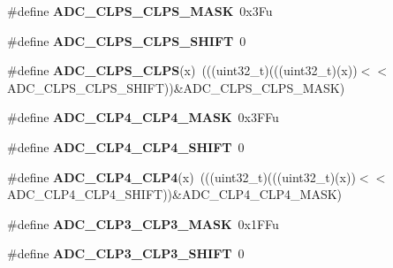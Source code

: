 \begin{DoxyCompactItemize}
\item 
\#define {\bfseries A\+D\+C\+\_\+\+C\+L\+P\+S\+\_\+\+C\+L\+P\+S\+\_\+\+M\+A\+SK}~0x3\+Fu\hypertarget{group__ADC__Register__Masks_gaccedf61066feb0b1c6d6bd7794d2a79c}{}\label{group__ADC__Register__Masks_gaccedf61066feb0b1c6d6bd7794d2a79c}

\item 
\#define {\bfseries A\+D\+C\+\_\+\+C\+L\+P\+S\+\_\+\+C\+L\+P\+S\+\_\+\+S\+H\+I\+FT}~0\hypertarget{group__ADC__Register__Masks_ga94f5e6c337622e8c4b8d03201e1c2d11}{}\label{group__ADC__Register__Masks_ga94f5e6c337622e8c4b8d03201e1c2d11}

\item 
\#define {\bfseries A\+D\+C\+\_\+\+C\+L\+P\+S\+\_\+\+C\+L\+PS}(x)~(((uint32\+\_\+t)(((uint32\+\_\+t)(x))$<$$<$A\+D\+C\+\_\+\+C\+L\+P\+S\+\_\+\+C\+L\+P\+S\+\_\+\+S\+H\+I\+FT))\&A\+D\+C\+\_\+\+C\+L\+P\+S\+\_\+\+C\+L\+P\+S\+\_\+\+M\+A\+SK)\hypertarget{group__ADC__Register__Masks_ga7b8e212b6c7c8504784c5af551e2b6bd}{}\label{group__ADC__Register__Masks_ga7b8e212b6c7c8504784c5af551e2b6bd}

\item 
\#define {\bfseries A\+D\+C\+\_\+\+C\+L\+P4\+\_\+\+C\+L\+P4\+\_\+\+M\+A\+SK}~0x3\+F\+Fu\hypertarget{group__ADC__Register__Masks_ga877d163ca4067627ebb29125d75eb757}{}\label{group__ADC__Register__Masks_ga877d163ca4067627ebb29125d75eb757}

\item 
\#define {\bfseries A\+D\+C\+\_\+\+C\+L\+P4\+\_\+\+C\+L\+P4\+\_\+\+S\+H\+I\+FT}~0\hypertarget{group__ADC__Register__Masks_gaee16600c1dd7fefead073d24320818a4}{}\label{group__ADC__Register__Masks_gaee16600c1dd7fefead073d24320818a4}

\item 
\#define {\bfseries A\+D\+C\+\_\+\+C\+L\+P4\+\_\+\+C\+L\+P4}(x)~(((uint32\+\_\+t)(((uint32\+\_\+t)(x))$<$$<$A\+D\+C\+\_\+\+C\+L\+P4\+\_\+\+C\+L\+P4\+\_\+\+S\+H\+I\+FT))\&A\+D\+C\+\_\+\+C\+L\+P4\+\_\+\+C\+L\+P4\+\_\+\+M\+A\+SK)\hypertarget{group__ADC__Register__Masks_gac1366655a895ce73fc06cd74002258a5}{}\label{group__ADC__Register__Masks_gac1366655a895ce73fc06cd74002258a5}

\item 
\#define {\bfseries A\+D\+C\+\_\+\+C\+L\+P3\+\_\+\+C\+L\+P3\+\_\+\+M\+A\+SK}~0x1\+F\+Fu\hypertarget{group__ADC__Register__Masks_gaeae73e0daf3e9a9174024850a719768d}{}\label{group__ADC__Register__Masks_gaeae73e0daf3e9a9174024850a719768d}

\item 
\#define {\bfseries A\+D\+C\+\_\+\+C\+L\+P3\+\_\+\+C\+L\+P3\+\_\+\+S\+H\+I\+FT}~0\hypertarget{group__ADC__Register__Masks_ga9eef257b72d4181481aa5e3bf0a85732}{}\label{group__ADC__Register__Masks_ga9eef257b72d4181481aa5e3bf0a85732}


\end{DoxyCompactItemize}
